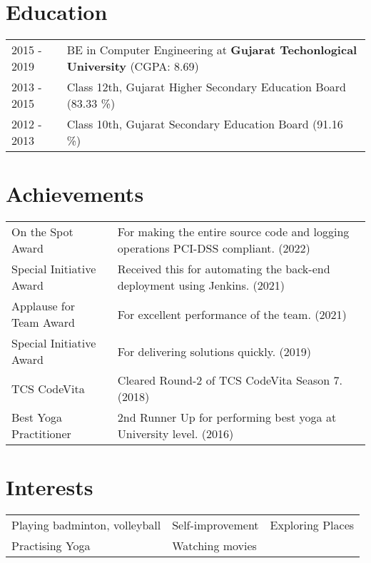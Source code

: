 \documentclass[a4paper,10.5pt]{article}
\begin{document}
\section{Education}
\begin{tabularx}{\linewidth}{@{}l X@{}}	
2015 - 2019 & BE in Computer Engineering at \textbf{Gujarat Techonlogical University} \hfill (CGPA: 8.69) \\
2013 - 2015 & Class 12th, Gujarat Higher Secondary Education Board \hfill (83.33 \%) \\
2012 - 2013 & Class 10th, Gujarat Secondary Education Board \hfill (91.16 \%) \\ 
\end{tabularx}

\section{Achievements}
\begin{tabularx}{\linewidth}{@{}l X@{}}	
On the Spot Award & For making the entire source code and logging operations PCI-DSS compliant. (2022) \\
Special Initiative Award & Received this for automating the back-end deployment using Jenkins. (2021) \\
Applause for Team Award & For excellent performance of the team. (2021) \\
Special Initiative Award & For delivering solutions quickly. (2019) \\
TCS CodeVita & Cleared Round-2 of TCS CodeVita Season 7. (2018) \\
Best Yoga Practitioner & 2nd Runner Up for performing best yoga at University level. (2016) \\
\end{tabularx}

\section{Interests}
\begin{tabularx}{\linewidth}{@{}X @{}X @{}X}	
Playing badminton, volleyball & Self-improvement & Exploring Places \\
Practising Yoga & Watching movies \\
\end{tabularx}
\end{document}
